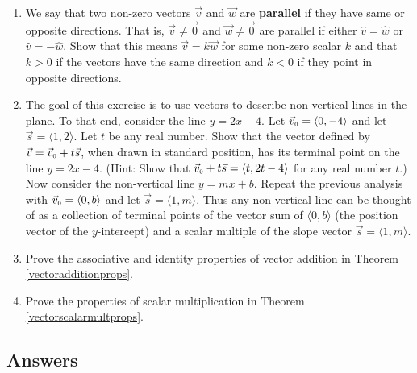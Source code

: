 \begin{enumerate}
\item We say that two non-zero vectors $\vec{v}$ and $\vec{w}$ are {\bf parallel} if they have same or opposite directions.  That is, $\vec{v} \neq \vec{0}$ and $\vec{w} \neq \vec{0}$ are parallel if either $\hat{v} = \hat{w}$ or $\hat{v} = -\hat{w}$.  Show that this means $\vec{v} = k\vec{w}$ for some non-zero scalar $k$ and that $k > 0$ if the vectors have the same direction and $k < 0$ if they point in opposite directions.
\label{parallelvectorexercise}

\item The goal of this exercise is to use vectors to describe non-vertical lines in the plane.  To that end, consider the line $y = 2x - 4$. Let $\vec{v}_{\text{\tiny $0$}} = \langle 0, -4 \rangle$ and let $\vec{s} = \langle 1, 2 \rangle$.  Let $t$ be any real number.  Show that the vector defined by $\vec{v} = \vec{v}_{\text{\tiny $0$}} + t\vec{s}$, when drawn in standard position, has its terminal point on the line $y = 2x - 4$.  (Hint: Show that $\vec{v}_{\text{\tiny $0$}} + t\vec{s} = \langle t, 2t - 4 \rangle$ for any real number $t$.)  Now consider the non-vertical line $y = mx + b$.  Repeat the previous analysis with  $\vec{v}_{\text{\tiny $0$}} = \langle 0, b \rangle$ and let $\vec{s} = \langle 1, m \rangle$.  Thus any non-vertical line can be thought of as a collection of terminal points of the vector sum of $\langle 0, b \rangle$ (the position vector of the $y$-intercept) and a scalar multiple of the slope vector $\vec{s} = \langle 1, m \rangle$.
\label{2dvectorsgiveuslines} 

\item Prove the associative and identity properties of vector addition in Theorem \ref{vectoradditionprops}.

\item Prove the properties of scalar multiplication in Theorem \ref{vectorscalarmultprops}. 

\end{enumerate}

\newpage

\subsection{Answers}

